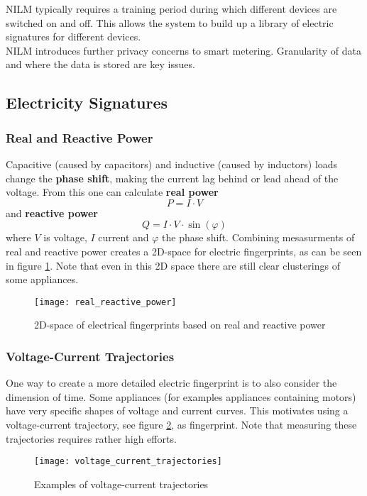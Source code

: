 NILM typically requires a training period during which different devices are switched on and off.
This allows the system to build up a library of electric signatures for different devices.\\

NILM introduces further privacy concerns to smart metering.
Granularity of data and where the data is stored are key issues.

\subsection{Electricity Signatures}
\label{sec:electric_fingerprints}

\subsubsection{Real and Reactive Power}
Capacitive (caused by capacitors) and inductive (caused by inductors) loads change the \textbf{phase shift}, making the current lag behind or lead ahead of the voltage.
From this one can calculate \textbf{real power}
$$
P = I \cdot V
$$
and \textbf{reactive power}
$$
Q = I \cdot V \cdot \sin(\varphi)
$$
where $V$ is voltage, $I$ current and $\varphi$ the phase shift.
Combining mesasurments of real and reactive power creates a 2D-space for electric fingerprints, as can be seen in figure \ref{fig:real_reactive_power}.
Note that even in this 2D space there are still clear clusterings of some appliances.

\begin{figure}
    \centering
    \texttt{[image: real\_reactive\_power]}
    \caption{2D-space of electrical fingerprints based on real and reactive power}
    \label{fig:real_reactive_power}
\end{figure}

\subsubsection{Voltage-Current Trajectories}
One way to create a more detailed electric fingerprint is to also consider the dimension of time.
Some appliances (for examples appliances containing motors) have very specific shapes of voltage and current curves.
This motivates using a voltage-current trajectory, see figure \ref{fig:voltage_current_trajectories}, as fingerprint.
Note that measuring these trajectories requires rather high efforts.

\begin{figure}
    \centering
    \texttt{[image: voltage\_current\_trajectories]}
    \caption{Examples of voltage-current trajectories}
    \label{fig:voltage_current_trajectories}
\end{figure}

